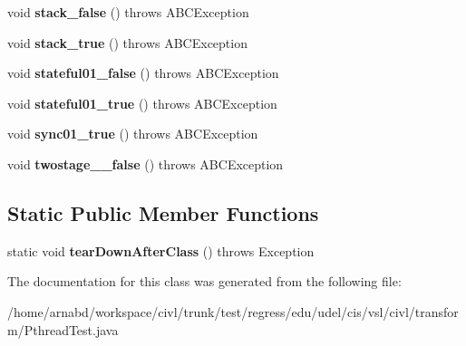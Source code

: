 \begin{DoxyCompactItemize}
\item 
\hypertarget{classedu_1_1udel_1_1cis_1_1vsl_1_1civl_1_1transform_1_1PthreadTest_ae91abe7263def446704efa3017d5a1f0}{}void {\bfseries stack\+\_\+false} ()  throws A\+B\+C\+Exception \label{classedu_1_1udel_1_1cis_1_1vsl_1_1civl_1_1transform_1_1PthreadTest_ae91abe7263def446704efa3017d5a1f0}

\item 
\hypertarget{classedu_1_1udel_1_1cis_1_1vsl_1_1civl_1_1transform_1_1PthreadTest_aa1796999bcabb17ee12dbc541d3c1939}{}void {\bfseries stack\+\_\+true} ()  throws A\+B\+C\+Exception \label{classedu_1_1udel_1_1cis_1_1vsl_1_1civl_1_1transform_1_1PthreadTest_aa1796999bcabb17ee12dbc541d3c1939}

\item 
\hypertarget{classedu_1_1udel_1_1cis_1_1vsl_1_1civl_1_1transform_1_1PthreadTest_a47566a39f35ee3b6414476ff4e0c8402}{}void {\bfseries stateful01\+\_\+false} ()  throws A\+B\+C\+Exception \label{classedu_1_1udel_1_1cis_1_1vsl_1_1civl_1_1transform_1_1PthreadTest_a47566a39f35ee3b6414476ff4e0c8402}

\item 
\hypertarget{classedu_1_1udel_1_1cis_1_1vsl_1_1civl_1_1transform_1_1PthreadTest_a69da059a88902d0c871c787373ce7af7}{}void {\bfseries stateful01\+\_\+true} ()  throws A\+B\+C\+Exception \label{classedu_1_1udel_1_1cis_1_1vsl_1_1civl_1_1transform_1_1PthreadTest_a69da059a88902d0c871c787373ce7af7}

\item 
\hypertarget{classedu_1_1udel_1_1cis_1_1vsl_1_1civl_1_1transform_1_1PthreadTest_a7f915105b5c0549cfea047dbdff5401b}{}void {\bfseries sync01\+\_\+true} ()  throws A\+B\+C\+Exception \label{classedu_1_1udel_1_1cis_1_1vsl_1_1civl_1_1transform_1_1PthreadTest_a7f915105b5c0549cfea047dbdff5401b}

\item 
\hypertarget{classedu_1_1udel_1_1cis_1_1vsl_1_1civl_1_1transform_1_1PthreadTest_a61639bb61ea8c6ea32630b7d8bc629ac}{}void {\bfseries twostage\+\_\+\_\+false} ()  throws A\+B\+C\+Exception \label{classedu_1_1udel_1_1cis_1_1vsl_1_1civl_1_1transform_1_1PthreadTest_a61639bb61ea8c6ea32630b7d8bc629ac}

\end{DoxyCompactItemize}
\subsection*{Static Public Member Functions}
\begin{DoxyCompactItemize}
\item 
\hypertarget{classedu_1_1udel_1_1cis_1_1vsl_1_1civl_1_1transform_1_1PthreadTest_acf0488bc321999bd183a12a9516c518c}{}static void {\bfseries tear\+Down\+After\+Class} ()  throws Exception \label{classedu_1_1udel_1_1cis_1_1vsl_1_1civl_1_1transform_1_1PthreadTest_acf0488bc321999bd183a12a9516c518c}

\end{DoxyCompactItemize}


The documentation for this class was generated from the following file\+:\begin{DoxyCompactItemize}
\item 
/home/arnabd/workspace/civl/trunk/test/regress/edu/udel/cis/vsl/civl/transform/Pthread\+Test.\+java\end{DoxyCompactItemize}

